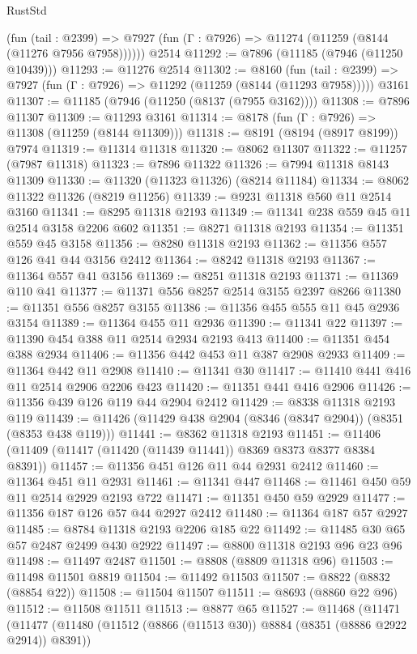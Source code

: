 \begin{lexlean}{RustStd}
\begin{coremodule}
{\begin{coremodule}
{{{{{{{{{{{{{{{{{{{{{{{{{{{{{{{{{{{{{{{{{{{{{{{{{{      (fun (tail : @2399) =>
      @7927 (fun (Γ : @7926) => @11274 (@11259 (@8144 (@11276 @7956 @7958))))))
    @2514
@11292 := @7896 (@11185 (@7946 (@11250 @10439)))
@11293 := @11276 @2514
@11302 := @8160
    (fun (tail : @2399) => @7927 (fun (Γ : @7926) => @11292 (@11259 (@8144 (@11293 @7958)))))
    @3161
@11307 := @11185 (@7946 (@11250 (@8137 (@7955 @3162))))
@11308 := @7896 @11307
@11309 := @11293 @3161
@11314 := @8178 (fun (Γ : @7926) => @11308 (@11259 (@8144 @11309)))
@11318 := @8191 (@8194 (@8917 @8199)) @7974
@11319 := @11314 @11318
@11320 := @8062 @11307
@11322 := @11257 (@7987 @11318)
@11323 := @7896 @11322
@11326 := @7994 @11318 @8143 @11309
@11330 := @11320 (@11323 @11326) (@8214 @11184)
@11334 := @8062 @11322 @11326 (@8219 @11256)
@11339 := @9231 @11318 @560 @11 @2514 @3160
@11341 := @8295 @11318 @2193
@11349 := @11341 @238 @559 @45 @11 @2514 @3158 @2206 @602
@11351 := @8271 @11318 @2193
@11354 := @11351 @559 @45 @3158
@11356 := @8280 @11318 @2193
@11362 := @11356 @557 @126 @41 @44 @3156 @2412
@11364 := @8242 @11318 @2193
@11367 := @11364 @557 @41 @3156
@11369 := @8251 @11318 @2193
@11371 := @11369 @110 @41
@11377 := @11371 @556 @8257 @2514 @3155 @2397 @8266
@11380 := @11351 @556 @8257 @3155
@11386 := @11356 @455 @555 @11 @45 @2936 @3154
@11389 := @11364 @455 @11 @2936
@11390 := @11341 @22
@11397 := @11390 @454 @388 @11 @2514 @2934 @2193 @413
@11400 := @11351 @454 @388 @2934
@11406 := @11356 @442 @453 @11 @387 @2908 @2933
@11409 := @11364 @442 @11 @2908
@11410 := @11341 @30
@11417 := @11410 @441 @416 @11 @2514 @2906 @2206 @423
@11420 := @11351 @441 @416 @2906
@11426 := @11356 @439 @126 @119 @44 @2904 @2412
@11429 := @8338 @11318 @2193 @119
@11439 := @11426 (@11429 @438 @2904 (@8346 (@8347 @2904)) (@8351 (@8353 @438 @119)))
@11441 := @8362 @11318 @2193
@11451 := @11406 (@11409 (@11417 (@11420 (@11439 @11441)) @8369 @8373 @8377 @8384 @8391))
@11457 := @11356 @451 @126 @11 @44 @2931 @2412
@11460 := @11364 @451 @11 @2931
@11461 := @11341 @447
@11468 := @11461 @450 @59 @11 @2514 @2929 @2193 @722
@11471 := @11351 @450 @59 @2929
@11477 := @11356 @187 @126 @57 @44 @2927 @2412
@11480 := @11364 @187 @57 @2927
@11485 := @8784 @11318 @2193 @2206 @185 @22
@11492 := @11485 @30 @65 @57 @2487 @2499 @430 @2922
@11497 := @8800 @11318 @2193 @96 @23 @96
@11498 := @11497 @2487
@11501 := @8808 (@8809 @11318 @96)
@11503 := @11498 @11501 @8819
@11504 := @11492 @11503
@11507 := @8822 (@8832 (@8854 @22))
@11508 := @11504 @11507
@11511 := @8693 (@8860 @22 @96)
@11512 := @11508 @11511
@11513 := @8877 @65
@11527 := @11468
    (@11471
      (@11477
        (@11480 (@11512 (@8866 (@11513 @30)) @8884 (@8351 (@8886 @2922 @2914)) @8391))
}}}}}}}}}}}}}}}}}}}}}}}}}}}}}}}}}}}}}}}}}}}}}}}}}}
\end{coremodule}}
\end{coremodule}
\end{lexlean}
